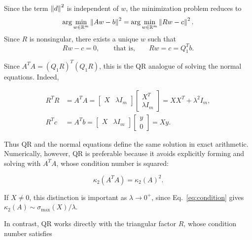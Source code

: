 \noindent Since the term $\left\|d\right\|^2$ is independent of $w$, the minimization problem reduces to
\begin{equation}
\label{eq:qr_triangular_solve}
    \arg\min_{w\in\mathbb{R}^m} \left\|Aw-b\right\|^2
    =
    \arg\min_{w\in\mathbb{R}^m} \left\|Rw-c\right\|^2.
\end{equation}
\noindent Since $R$ is nonsingular, there exists a unique $w$ such that
\begin{equation}
    Rw-c=0,
    \qquad\text{that is,}\qquad
    Rw=c=Q_1^T b.
\end{equation}

\noindent Since $A^T A = (Q_1R)^{T}(Q_1R)$, this is the QR analogue of solving the normal equations. Indeed,

\begin{equation}
\label{eq:qr_normal_equivalence}
\begin{aligned}
    R^T R &= A^T A
    = \begin{bmatrix}
        X & \lambda I_m
    \end{bmatrix}
    \begin{bmatrix}
        X^T \\
        \lambda I_m
    \end{bmatrix}
    = XX^T + \lambda^2 I_m, \\
    R^T c &= A^T b
    = \begin{bmatrix}
        X & \lambda I_m
    \end{bmatrix}
    \begin{bmatrix}
        y \\
        0
    \end{bmatrix}
    = Xy.
\end{aligned}
\end{equation}


\noindent Thus QR and the normal equations define the same solution in exact arithmetic. Numerically, however, 
QR is preferable because it avoids explicitly forming and solving with $A^T A$, whose 
condition number is squared:

\begin{equation}
\label{eq:qr_condition_squaring}
    \kappa_2(A^T A) = \kappa_2(A)^{2}.
\end{equation}

\noindent If $X\neq0$, this distinction is important as $\lambda\to0^+$, since
Eq.~\eqref{eq:condition} gives
$\kappa_2(A)\sim\sigma_{\max}(X)/\lambda$.

\noindent In contrast, QR works directly with the triangular factor $R$, whose condition number satisfies


